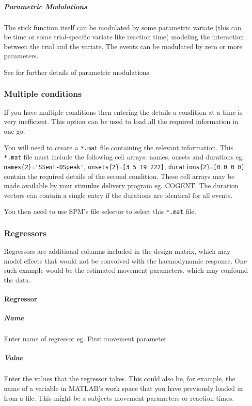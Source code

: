 \subparagraph{Parametric Modulations}

The stick function itself can be modulated by some parametric variate (this can be time or some trial-specific variate like reaction time) modeling the interaction between the trial and the variate. The events can be modulated by zero or more parameters.

See \cite{parametric_pet,parametric_fmri} for further details of parametric modulations.

\subsubsection{Multiple conditions}

If you have multiple conditions then entering the details a condition at a time is very inefficient. This option can be used to load all the required information in one go. 

You will need to create a \verb!*.mat! file containing the relevant information. This \verb!*.mat! file must include the following cell arrays: names, onsets and durations eg. \verb!names{2}='SSent-DSpeak'!, \verb!onsets{2}=[3 5 19 222]!, \verb!durations{2}=[0 0 0 0]! contain the required details of the second condition. These cell arrays may be made available by your stimulus delivery program eg. COGENT. The duration vectors can contain a single entry if the durations are identical for all events. 

You then need to use SPM's file selector to select this \verb!*.mat! file.

\subsubsection{Regressors}

Regressors are additional columns included in the design matrix, which may model effects that would not be convolved with the haemodynamic response.  One such example would be the estimated movement parameters, which may confound the data.

\paragraph{Regressor}

\subparagraph{Name}

Enter name of regressor eg. First movement parameter

\subparagraph{Value}

Enter the values that the regressor takes. This could also be, for example, the name of a variable in MATLAB's work space that you have previously loaded in from a file. This might be a subjects movement parameters or reaction times.

